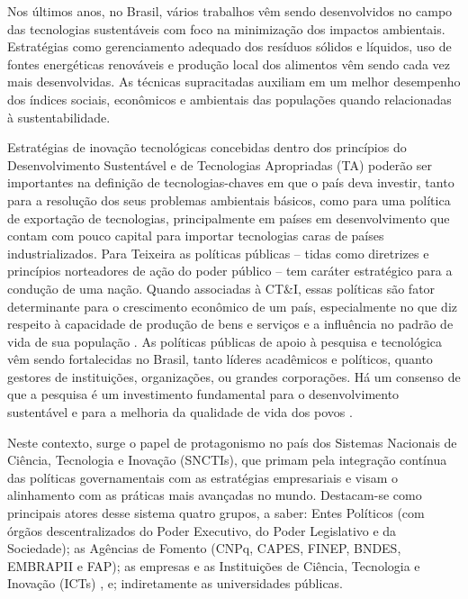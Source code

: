 Nos últimos anos, no Brasil, vários trabalhos vêm sendo desenvolvidos no campo das tecnologias sustentáveis com foco na minimização dos impactos ambientais. Estratégias como gerenciamento adequado dos resíduos sólidos e líquidos, uso de fontes energéticas renováveis e produção local dos alimentos vêm sendo cada vez mais desenvolvidas. As técnicas supracitadas auxiliam em um melhor desempenho dos índices sociais, econômicos e ambientais das populações quando relacionadas à sustentabilidade.

Estratégias de inovação tecnológicas concebidas dentro dos princípios do Desenvolvimento Sustentável e de Tecnologias Apropriadas (TA) poderão ser importantes na definição de tecnologias-chaves em que o país deva investir, tanto para a resolução dos seus problemas ambientais básicos, como para uma política de exportação de tecnologias, principalmente em países em desenvolvimento que contam com pouco capital para importar tecnologias caras de países industrializados. Para Teixeira  as políticas públicas – tidas como diretrizes e princípios norteadores de ação do poder público – tem caráter estratégico para a condução de uma nação. Quando associadas à CT\&I, essas políticas são fator determinante para o crescimento econômico de um país, especialmente no que diz respeito à capacidade de produção de bens e serviços e a influência no padrão de vida de sua população .
As políticas públicas de apoio à pesquisa e tecnológica vêm sendo fortalecidas no Brasil, tanto líderes acadêmicos e políticos, quanto gestores de instituições, organizações, ou grandes corporações.  Há um consenso de que a pesquisa é um investimento fundamental para o desenvolvimento sustentável e para a melhoria da qualidade de vida dos povos \cite{bufrem_politicas_2018}.

Neste contexto, surge o papel de protagonismo no país dos Sistemas Nacionais de Ciência, Tecnologia e Inovação (SNCTIs), que primam pela integração contínua das políticas governamentais com as estratégias empresariais e visam o alinhamento com as práticas mais avançadas no mundo. Destacam-se como principais atores desse sistema quatro grupos, a saber: Entes Políticos (com órgãos descentralizados do Poder Executivo, do Poder Legislativo e da Sociedade); as Agências de Fomento (CNPq, CAPES, FINEP, BNDES, EMBRAPII e FAP); as empresas e as Instituições de Ciência, Tecnologia e Inovação (ICTs) \cite{mcti_estrategia_2016}, e; indiretamente as universidades públicas.

